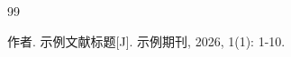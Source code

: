 \begin{thebibliography}{99}
\setlength{\itemsep}{2pt}


 作者. 示例文献标题[J]. 示例期刊, 2026, 1(1): 1-10.

\end{thebibliography}
